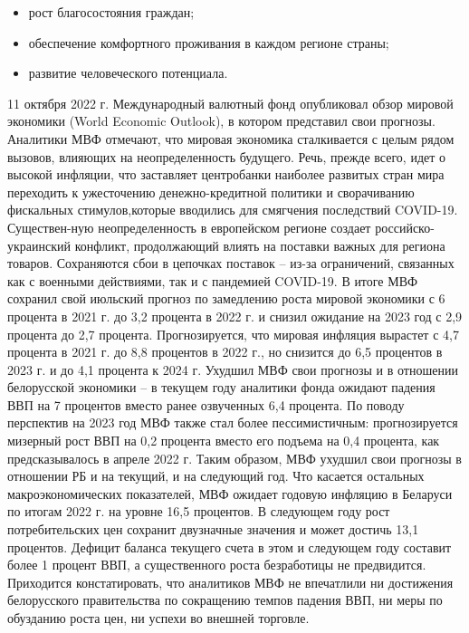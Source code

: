 \documentclass[14pt,a4paper]{article}
\begin{document}
    \begin{itemize}
        \item рост благосостояния граждан;
        \item обеспечение комфортного проживания в каждом регионе страны;
        \item развитие человеческого потенциала.
    \end{itemize}
    \par
    11 октября 2022 г. Международный валютный фонд опубликовал обзор мировой экономики (World Economic Outlook), в котором представил свои прогнозы.
    Аналитики МВФ отмечают, что мировая экономика сталкивается с целым рядом вызовов, влияющих на неопределенность будущего.
    Речь, прежде всего, идет о высокой инфляции, что заставляет центробанки наиболее развитых стран мира переходить к ужесточению денежно-кредитной политики и сворачиванию фискальных стимулов,которые вводились для смягчения последствий COVID-19.
    Существен-ную неопределенность в европейском регионе создает российско-украинский конфликт, продолжающий влиять на поставки важных для региона товаров.
    Сохраняются сбои в цепочках поставок – из-за ограничений, связанных как с военными действиями, так и с пандемией COVID-19.
    В итоге МВФ сохранил свой июльский прогноз по замедлению роста мировой экономики с 6 процента в 2021 г. до 3,2 процента в 2022 г. и снизил ожидание на 2023 год с 2,9 процента до 2,7 процента.
    Прогнозируется, что мировая инфляция вырастет с 4,7 процента в 2021 г. до 8,8 процентов в 2022 г., но снизится до 6,5 процентов в 2023 г. и до 4,1 процента к 2024 г.
    Ухудшил МВФ свои прогнозы и в отношении белорусской экономики – в текущем году аналитики фонда ожидают падения ВВП на 7 процентов вместо ранее озвученных 6,4 процента.
    По поводу перспектив на 2023 год МВФ также стал более пессимистичным: прогнозируется мизерный рост ВВП на 0,2 процента вместо его подъема на 0,4 процента, как предсказывалось в апреле 2022 г.
    Таким образом, МВФ ухудшил свои прогнозы в отношении РБ и на текущий, и на следующий год. Что касается остальных макроэкономических показателей, МВФ ожидает годовую инфляцию в Беларуси по итогам 2022 г. на уровне 16,5 процентов.
    В следующем году рост потребительских цен сохранит двузначные значения и может достичь 13,1 процентов.
    Дефицит баланса текущего счета в этом и следующем году составит более 1 процент ВВП, а существенного роста безработицы не предвидится.
    Приходится констатировать, что аналитиков МВФ не впечатлили ни достижения белорусского правительства по сокращению темпов падения ВВП, ни меры по обузданию роста цен, ни успехи во внешней торговле.
\end{document}
